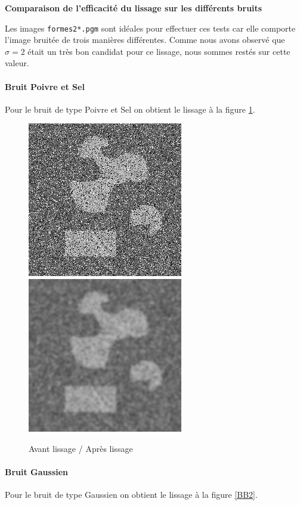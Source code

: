 \documentclass[paper=a4, fontsize=11pt]{scrartcl} %
\begin{document}
\newpage

\textbf{Comparaison de l'efficacité du lissage sur les différents bruits}

Les images \texttt{formes2*.pgm} sont idéales pour effectuer ces tests car elle comporte l'image bruitée de trois manières différentes. Comme nous avons observé que $\sigma=2$ était un très bon candidat pour ce lissage, nous sommes restés sur cette valeur.

\paragraph{Bruit Poivre et Sel}
Pour le bruit de type Poivre et Sel on obtient le lissage à la figure \ref{PETS2}.

\begin{figure}[h!]
\caption{Avant lissage / Après lissage}
\label{PETS2}
\centering
\includegraphics[scale=0.6]{images/rapport/pets/formes2pets5.png} 
\includegraphics[scale=0.6]{images/rapport/pets/pets5sig2.png}
\end{figure}

\paragraph{Bruit Gaussien}
Pour le bruit de type Gaussien on obtient le lissage à la figure \ref{BB2}.
\end{document}
